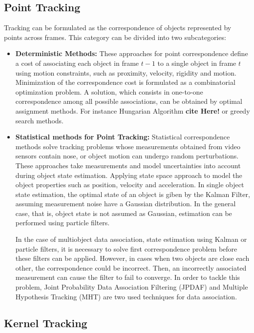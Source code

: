 \subsection{Point Tracking}

Tracking can be formulated as the correspondence of objects represented by points across frames. This category can be divided into two subcategories:
\begin{itemize}
	\item \textbf{Deterministic Methods: } These approaches for point correspondence define a cost of associating each object in frame $t-1$ to a single object in frame $t$ using motion constraints, such as proximity, velocity, rigidity and motion. Minimization of the correspondence cost is formulated as a combinatorial optimization problem. A solution, which consists in one-to-one correspondence among all possible associations, can be obtained by optimal assignment methods. For instance Hungarian Algorithm \textbf{cite Here!} or greedy search methods.

	\item \textbf{Statistical methods for Point Tracking: } Statistical correspondence methods solve tracking problems whose measurements obtained from video sensors contain nose, or object motion can undergo random perturbations. These approaches take measurements and model uncertainties into account during object state estimation. Applying state space approach to model the object properties such as position, velocity and acceleration. In single object state estimation, the optimal state of an object is giben by the Kalman Filter, assuming measurement noise have a Gaussian distribution. In the general case, that is, object state is not assumed as Gaussian, estimation can be performed using particle filters.

	In the case of multiobject data association, state estimation using Kalman or particle filters, it is necessary to solve first correspondence problem before these filters can be applied. However, in cases when two objects are close each other, the correspondence could be incorrect. Then, an incorrectly associated measurement can cause the filter to fail to converge. In order to tackle this problem, Joint Probability Data Association Filtering (JPDAF) and Multiple Hypothesis Tracking (MHT) are two used techniques for data association.
\end{itemize}

\subsection{Kernel Tracking}

